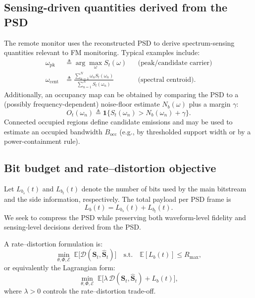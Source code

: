 \documentclass[11pt]{article}
\begin{document}
\subsection{Sensing-driven quantities derived from the PSD}
The remote monitor uses the reconstructed PSD to derive spectrum-sensing quantities relevant to FM monitoring. Typical examples include:
\begin{align}
\omega_{\mathrm{pk}} &\triangleq \arg\max_{\omega} S_t(\omega) && \text{(peak/candidate carrier)} \\
\omega_{\mathrm{cent}} &\triangleq \frac{\sum_{n=1}^{N}\omega_n S_t(\omega_n)}{\sum_{n=1}^{N} S_t(\omega_n)} && \text{(spectral centroid)}.
\end{align}
Additionally, an occupancy map can be obtained by comparing the PSD to a (possibly frequency-dependent) noise-floor estimate $N_b(\omega)$ plus a margin $\gamma$:
\begin{equation}
O_t(\omega_n) \triangleq \mathbf{1}\{S_t(\omega_n) > N_b(\omega_n)+\gamma\}.
\end{equation}
Connected occupied regions define candidate emissions and may be used to estimate an occupied bandwidth $B_{\mathrm{occ}}$ (e.g., by thresholded support width or by a power-containment rule).

\subsection{Bit budget and rate--distortion objective}
Let $L_{b_s}(t)$ and $L_{b_t}(t)$ denote the number of bits used by the main bitstream and the side information, respectively. The total payload per PSD frame is
\begin{equation}
L_b(t) = L_{b_s}(t) + L_{b_t}(t).
\end{equation}
We seek to compress the PSD while preserving both waveform-level fidelity and sensing-level decisions derived from the PSD.

A rate--distortion formulation is:
\begin{equation}
\min_{\theta,\Phi,\mathcal{E}} \; \mathbb{E}\big[\mathcal{D}(\mathbf{S}_t,\hat{\mathbf{S}}_t)\big]
\quad \text{s.t.}\quad
\mathbb{E}[L_b(t)] \le R_{\max},
\end{equation}
or equivalently the Lagrangian form:
\begin{equation}
\min_{\theta,\Phi,\mathcal{E}} \; \mathbb{E}\Big[\lambda\,\mathcal{D}(\mathbf{S}_t,\hat{\mathbf{S}}_t) + L_b(t)\Big],
\end{equation}
where $\lambda>0$ controls the rate--distortion trade-off.
\end{document}
